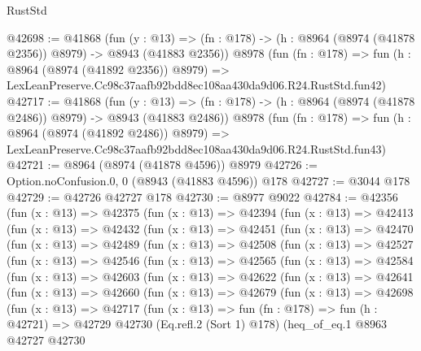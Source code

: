 \begin{lexlean}{RustStd}
\begin{coremodule}
@42698 := @41868
    (fun (y : @13) =>
    (fn : @178) -> (h : @8964 (@8974 (@41878 @2356)) @8979) -> @8943 (@41883 @2356))
    @8978
    (fun (fn : @178) =>
    fun (h : @8964 (@8974 (@41892 @2356)) @8979) =>
    LexLeanPreserve.Cc98c37aafb92bdd8ec108aa430da9d06.R24.RustStd.fun42)
@42717 := @41868
    (fun (y : @13) =>
    (fn : @178) -> (h : @8964 (@8974 (@41878 @2486)) @8979) -> @8943 (@41883 @2486))
    @8978
    (fun (fn : @178) =>
    fun (h : @8964 (@8974 (@41892 @2486)) @8979) =>
    LexLeanPreserve.Cc98c37aafb92bdd8ec108aa430da9d06.R24.RustStd.fun43)
@42721 := @8964 (@8974 (@41878 @4596)) @8979
@42726 := Option.noConfusion.{0, 0} (@8943 (@41883 @4596)) @178
@42727 := @3044 @178
@42729 := @42726 @42727 @178
@42730 := @8977 @9022
@42784 := @42356
    (fun (x : @13) =>
    @42375
      (fun (x : @13) =>
      @42394
        (fun (x : @13) =>
        @42413
          (fun (x : @13) =>
          @42432
            (fun (x : @13) =>
            @42451
              (fun (x : @13) =>
              @42470
                (fun (x : @13) =>
                @42489
                  (fun (x : @13) =>
                  @42508
                    (fun (x : @13) =>
                    @42527
                      (fun (x : @13) =>
                      @42546
                        (fun (x : @13) =>
                        @42565
                          (fun (x : @13) =>
                          @42584
                            (fun (x : @13) =>
                            @42603
                              (fun (x : @13) =>
                              @42622
                                (fun (x : @13) =>
                                @42641
                                  (fun (x : @13) =>
                                  @42660
                                    (fun (x : @13) =>
                                    @42679
                                      (fun (x : @13) =>
                                      @42698
                                        (fun (x : @13) =>
                                        @42717
                                          (fun (x : @13) =>
                                          fun (fn : @178) =>
                                          fun (h : @42721) =>
                                          @42729
                                            @42730
                                            (Eq.refl.{2} (Sort 1) @178)
                                            (heq_of_eq.{1}
                                              @8963
                                              @42727
                                              @42730

\end{coremodule}
\end{lexlean}
